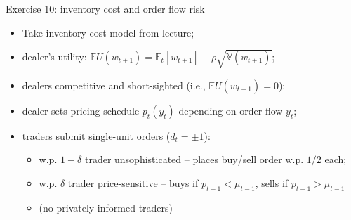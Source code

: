 \documentclass[english,10pt
,aspectratio=169
]{beamer}
\begin{document}
\begin{frame}[label=ex10]{Exercise 10: inventory cost and order flow risk}
	\begin{itemize}
		\item Take inventory cost model from lecture;
		\item dealer's utility: $\mathbb{E}U(w_{t+1}) = \mathbb{E}_t [w_{t+1}] - \rho \sqrt{\mathbb{V}(w_{t+1})}$;
		\item dealers competitive and short-sighted (i.e., $\mathbb{E}U(w_{t+1})=0$);
		\item dealer sets pricing schedule $p_t(y_t)$ depending on order flow $y_t$;
		\item traders submit single-unit orders ($d_t = \pm 1$):
		\begin{itemize}
			\item w.p. $1-\delta$ trader unsophisticated -- places buy/sell order w.p. $1/2$ each;
			\item w.p. $\delta$ trader price-sensitive -- buys if $p_{t-1} < \mu_{t-1}$, sells if $p_{t-1} > \mu_{t-1}$
			\item (no privately informed traders)
		\end{itemize}
	\end{itemize}
\end{frame}
\end{document}
